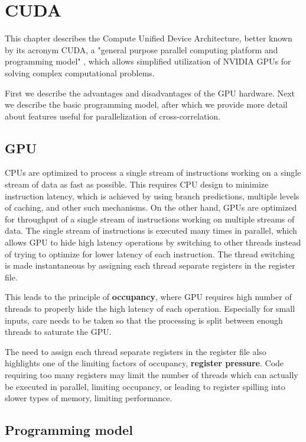 \chapter{CUDA}

This chapter describes the Compute Unified Device Architecture, better known by its acronym CUDA, a "general purpose parallel computing platform and programming model" \citep{site:cuda}, which allows simplified utilization of NVIDIA GPUs for solving complex computational problems.

First we describe the advantages and disadvantages of the GPU hardware. Next we describe the basic programming model, after which we provide more detail about features useful for parallelization of cross-correlation.

\section{GPU}
\label{sec:gpu}

CPUs are optimized to process a single stream of instructions working on a single stream of data as fast as possible. This requires CPU design to minimize instruction latency, which is achieved by using branch predictions, multiple levels of caching, and other such mechanisms. On the other hand, GPUs are optimized for throughput of a single stream of instructions working on multiple streams of data. The single stream of instructions is executed many times in parallel, which allows GPU to hide high latency operations by switching to other threads instead of trying to optimize for lower latency of each instruction. The thread switching is made instantaneous by assigning each thread separate registers in the register file.

This leads to the principle of \textbf{occupancy}, where GPU requires high number of threads to properly hide the high latency of each operation. Especially for small inputs, care needs to be taken so that the processing is split between enough threads to saturate the GPU.

The need to assign each thread separate registers in the register file also highlights one of the limiting factors of occupancy, \textbf{register pressure}. Code requiring too many registers may limit the number of threads which can actually be executed in parallel, limiting occupancy, or leading to register spilling into slower types of memory, limiting performance.


\section{Programming model}
\label{sec:programming_model}

